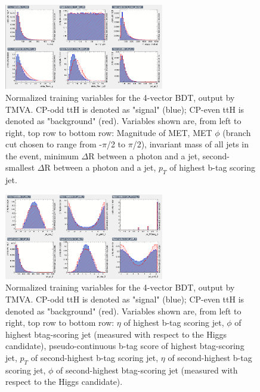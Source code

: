 \begin{figure}[htbp]
  \centering
  \includegraphics[width=0.62\textwidth]{figures/TMVABDTStudies/had-vbls4vec/had4vecvbls2.png}
  \caption{Normalized training variables for the 4-vector BDT, output by TMVA. CP-odd ttH is denoted as "signal" (blue); CP-even ttH is denoted as "background" (red). Variables shown are, from left to right, top row to bottom row: Magnitude of MET, MET $\phi$ (branch cut chosen to range from -$\pi$/2 to $\pi$/2), invariant mass of all jets in the event, minimum $\Delta$R between a photon and a jet, second-smallest $\Delta$R between a photon and a jet, $p_{T}$ of highest b-tag scoring jet.}
  \label{fig:had4vecvbls2}
\end{figure}

\begin{figure}[htbp]
  \centering
  \includegraphics[width=0.62\textwidth]{figures/TMVABDTStudies/had-vbls4vec/had4vecvbls3.png}
  \caption{Normalized training variables for the 4-vector BDT, output by TMVA. CP-odd ttH is denoted as "signal" (blue); CP-even ttH is denoted as "background" (red). Variables shown are, from left to right, top row to bottom row: $\eta$ of highest b-tag scoring jet, $\phi$ of highest btag-scoring jet (measured with respect to the Higgs candidate), pseudo-continuous b-tag score of highest btag-scoring jet, $p_{T}$ of second-highest b-tag scoring jet, $\eta$ of second-highest b-tag scoring jet, $\phi$ of second-highest btag-scoring jet (measured with respect to the Higgs candidate).}
  \label{fig:had4vecvbls3}
\end{figure}

